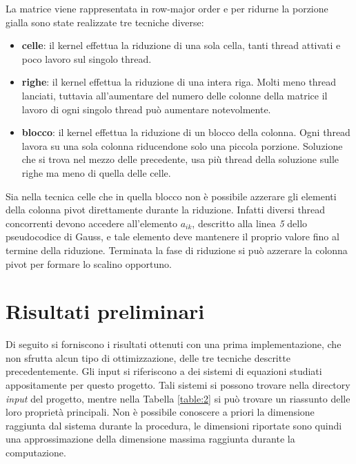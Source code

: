 \documentclass{article}
\begin{document}
La matrice viene rappresentata in row-major order e per ridurne la porzione gialla sono state realizzate tre tecniche diverse:
\begin{itemize}
\item \textbf{celle}: il kernel effettua la riduzione di una sola cella, tanti thread attivati e poco lavoro sul singolo thread.
\item \textbf{righe}: il kernel effettua la riduzione di una intera riga. Molti meno thread lanciati, tuttavia all'aumentare del numero delle colonne della matrice il lavoro di ogni singolo thread può aumentare notevolmente. 
\item \textbf{blocco}: il kernel effettua la riduzione di un blocco della colonna. Ogni thread lavora su una sola colonna riducendone solo una piccola porzione. Soluzione che si trova nel mezzo delle precedente, usa più thread della soluzione sulle righe ma meno di quella delle celle. 
\end{itemize}
Sia nella tecnica celle che in quella blocco non è possibile azzerare gli elementi della colonna pivot direttamente durante la riduzione. Infatti diversi thread concorrenti devono accedere all'elemento $a_{ik}$, descritto alla linea \textit{5} dello pseudocodice di Gauss, e tale elemento deve mantenere il proprio valore fino al termine della riduzione. Terminata la fase di riduzione si può azzerare la colonna pivot per formare lo scalino opportuno.




\section{Risultati preliminari}
Di seguito si forniscono i risultati ottenuti con una prima implementazione, che non sfrutta alcun tipo di ottimizzazione, delle tre tecniche descritte precedentemente. Gli input si riferiscono a dei sistemi di equazioni studiati appositamente per questo progetto. Tali sistemi si possono trovare nella directory \textit{input} del progetto, mentre nella Tabella \ref{table:2} si può trovare un riassunto delle loro proprietà principali. Non è possibile conoscere a priori la dimensione raggiunta dal sistema durante la procedura, le dimensioni riportate sono quindi una approssimazione della dimensione massima raggiunta durante la computazione. 
\end{document}
